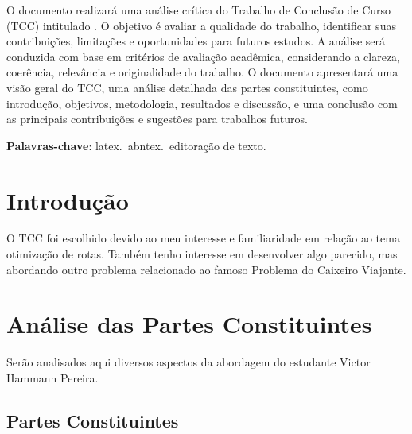 \documentclass[
    article,
    12pt,
    a4paper,
    english,
    brazil,
    sumario=tradicional
]{/home/lucas_galdino/Desktop/TCC/planning/abntex2/abntex2}
\begin{document}
\frenchspacing

\maketitle

\begin{resumoumacoluna}
    O documento realizará uma análise crítica do Trabalho de Conclusão de Curso (TCC)
    intitulado \cite{tcc_vitorhp}.
    O objetivo é avaliar a qualidade do trabalho, identificar suas contribuições, limitações e oportunidades para futuros estudos.
    A análise será conduzida com base em critérios de avaliação acadêmica, considerando a clareza, coerência, relevância e originalidade do trabalho.
    O documento apresentará uma visão geral do TCC, uma análise detalhada das partes constituintes, como introdução, objetivos, metodologia, resultados
    e discussão, e uma conclusão com as principais contribuições e sugestões para trabalhos futuros.

    \vspace{\onelineskip}

    \noindent
    \textbf{Palavras-chave}: latex.\ abntex.\ editoração de texto.
\end{resumoumacoluna}

\textual

\section{Introdução}

O TCC foi escolhido devido ao meu interesse e familiaridade em relação ao tema
otimização de rotas. Também tenho interesse em desenvolver algo parecido, mas abordando outro problema relacionado
ao famoso Problema do Caixeiro Viajante.


\section{Análise das Partes Constituintes}

Serão analisados aqui diversos aspectos da abordagem do estudante Victor
Hammann Pereira.

\subsection{Partes Constituintes}
\end{document}
